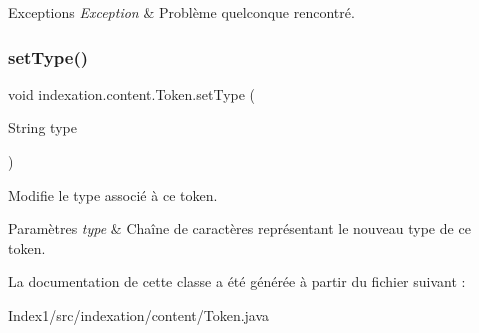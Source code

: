 \begin{DoxyExceptions}{Exceptions}
{\em Exception} & Problème quelconque rencontré. \\
\hline
\end{DoxyExceptions}
\mbox{\label{classindexation_1_1content_1_1Token_a8236aaf47af22ca342d273c64f760730}} 
\subsubsection{\texorpdfstring{set\+Type()}{setType()}}
{\footnotesize\ttfamily void indexation.\+content.\+Token.\+set\+Type (\begin{DoxyParamCaption}\item[{String}]{type }\end{DoxyParamCaption})}

Modifie le type associé à ce token.


\begin{DoxyParams}{Paramètres}
{\em type} & Chaîne de caractères représentant le nouveau type de ce token. \\
\hline
\end{DoxyParams}


La documentation de cette classe a été générée à partir du fichier suivant \+:\begin{DoxyCompactItemize}
\item 
Index1/src/indexation/content/Token.\+java\end{DoxyCompactItemize}
